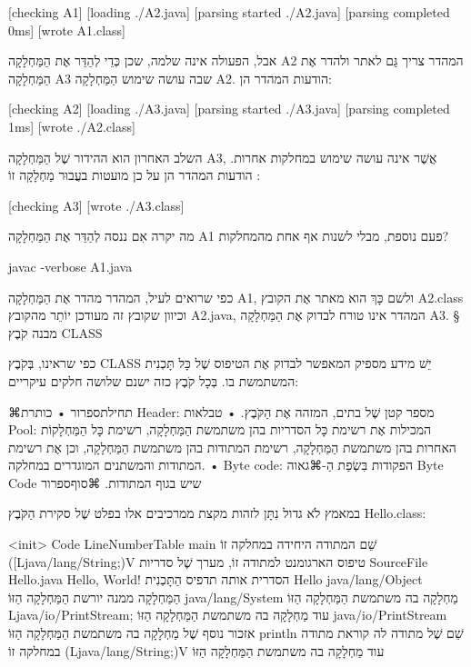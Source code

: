 [checking A1]
[loading ./A2.java]
[parsing started ./A2.java]
[parsing completed 0ms]
[wrote A1.class]

אבל, הפעולה אינה שלמה, שכן כְּדֵי לְהַדֵּר אֶת הַמַּחְלָקָה A2 המהדר צריך  גַּם
לאתר ולהדר אֶת הַמַּחְלָקָה A3 שבה עושה שימוש הַמַּחְלָקָה A2. הודעות המהדר הן:

[checking A2]
[loading ./A3.java]
[parsing started ./A3.java]
[parsing completed 1ms]
[wrote ./A2.class]

השלב האחרון הוא ההידור שֶׁל הַמַּחְלָקָה A3, אֲשֶׁר אינה עושה שימוש במחלקות
אחרות. הודעות המהדר הן על כן מועטות בעֲבוּר מַחְלָקָה זוֹ :

[checking A3]
[wrote ./A3.class]


מה יקרה אִם ננסה לְהַדֵּר אֶת הַמַּחְלָקָה A1 פעם נוספת, מבלי לשנות אף אחת
מהמחלקות?

javac -verbose A1.java
\END

כפי שרואים לעיל, המהדר מהדר אֶת הַמַּחְלָקָה A1, ולשם כָּךְ הוא מאתר אֶת הקובץ
A2.class וכיוון שקובץ זה מעודכן יוֹתֵר מהקובץ A2.java, המהדר אינו טורח לבדוק אֶת
הַמַּחְלָקָה A3.
§ מבנה קֹבֶץ CLASS

כפי שראינו, בְּקֹבֶץ CLASS יֵשׁ מידע מספיק המאפשר לבדוק אֶת הטיפוס שֶׁל כָּל
תָּכְנִית המשתמשת בו. בְּכָל קֹבֶץ כזה ישנם שלושה חלקים עיקריים:

⌘תחילת{ספרור}
•  כותרת Header: מספר קטן שֶׁל בתים,  המזהה אֶת הַקֹּבֶץ.
•  טבלאות Pool: המכילות אֶת רשימת כָּל הסדריות בהן משתמשת הַמַּחְלָקָה, רשימת
כָּל הַמַּחְלָקוֹת האחרות בהן משתמשת הַמַּחְלָקָה, רשימת המתודות בהן משתמשת
הַמַּחְלָקָה, וכן אֶת רשימת המתודות והמשתנים המוגדרים במחלקה.
•  Byte code: הפקודות בִּשְׂפַת הַ-⌘גאוה Byte Code שיש בגוף המתודות.
⌘סוף{ספרור}

במאמץ לֹא גדול נִתָּן לזהות מקצת ממרכיבים אלו בפלט שֶׁל סקירת הַקֹּבֶץ
Hello.class:


<init>
Code
LineNumberTable
main                                             שֵׁם המתודה היחידה במחלקה זוֹ
([Ljava/lang/String;)V                טיפוס הארגומנט למתודה זוֹ, מערך שֶׁל
סדריות
SourceFile
Hello.java
Hello, World!                                      הסדרית אותה תדפיס הַתָּכְנִית
Hello
java/lang/Object                               הַמַּחְלָקָה ממנה יורשת
הַמַּחְלָקָה הַזּוֹ
java/lang/System                               מַחְלָקָה בה משתמשת הַמַּחְלָקָה
הַזּוֹ
Ljava/io/PrintStream;                      עוד מַחְלָקָה בה משתמשת הַמַּחְלָקָה
הַזּוֹ
java/io/PrintStream               אזכור נוסף שֶׁל מַחְלָקָה בה משתמשת
הַמַּחְלָקָה הַזּוֹ
println                               שֵׁם שֶׁל מתודה לה קוראת מתודה במחלקה זוֹ
(Ljava/lang/String;)V                      עוד מַחְלָקָה בה משתמשת הַמַּחְלָקָה
הַזּוֹ


